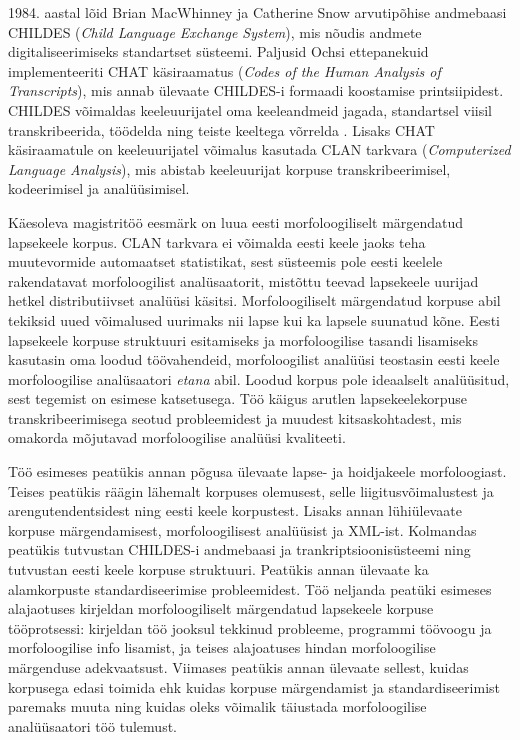 \documentclass[12pt]{article}
\begin{document}
1984. aastal lõid Brian MacWhinney ja Catherine Snow arvutipõhise andmebaasi CHILDES (\emph{Child Language Exchange System}), mis nõudis andmete digitaliseerimiseks standartset süsteemi. Paljusid Ochsi ettepanekuid implementeeriti CHAT käsiraamatus (\emph{Codes of the Human Analysis of Transcripts}), mis annab ülevaate CHILDES-i formaadi koostamise printsiipidest. CHILDES võimaldas keeleuurijatel oma keeleandmeid jagada, standartsel viisil transkribeerida, töödelda ning teiste keeltega võrrelda \citep{SnowMacWhinney}. Lisaks CHAT käsiraamatule on keeleuurijatel võimalus kasutada CLAN tarkvara (\emph{Computerized Language Analysis}), mis abistab keeleuurijat korpuse transkribeerimisel, kodeerimisel ja analüüsimisel.

Käesoleva magistritöö eesmärk on luua eesti morfoloogiliselt märgendatud lapsekeele korpus. CLAN tarkvara ei võimalda eesti keele jaoks teha muutevormide automaatset statistikat, sest süsteemis pole eesti keelele rakendatavat morfoloogilist analüsaatorit, mistõttu teevad lapsekeele uurijad hetkel distributiivset analüüsi käsitsi. Morfoloogiliselt märgendatud korpuse abil tekiksid uued võimalused uurimaks nii lapse kui ka lapsele suunatud kõne. Eesti lapsekeele korpuse struktuuri esitamiseks ja morfoloogilise tasandi lisamiseks kasutasin oma loodud töövahendeid, morfoloogilist analüüsi teostasin eesti keele morfoloogilise analüsaatori \emph{etana} abil. Loodud korpus pole ideaalselt analüüsitud, sest tegemist on esimese katsetusega. Töö käigus arutlen lapsekeelekorpuse transkribeerimisega seotud probleemidest ja muudest kitsaskohtadest, mis omakorda mõjutavad morfoloogilise analüüsi kvaliteeti.

Töö esimeses peatükis annan põgusa ülevaate lapse- ja hoidjakeele morfoloogiast. Teises peatükis räägin lähemalt korpuses olemusest, selle liigitusvõimalustest ja arengutendentsidest ning eesti keele korpustest. Lisaks annan lühiülevaate korpuse märgendamisest, morfoloogilisest analüüsist ja XML-ist. Kolmandas peatükis tutvustan CHILDES-i andmebaasi ja trankriptsioonisüsteemi ning tutvustan eesti keele korpuse struktuuri. Peatükis annan ülevaate ka alamkorpuste standardiseerimise probleemidest. Töö neljanda peatüki esimeses alajaotuses kirjeldan morfoloogiliselt märgendatud lapsekeele korpuse tööprotsessi: kirjeldan töö jooksul tekkinud probleeme, programmi töövoogu ja morfoloogilise info lisamist, ja teises alajoatuses hindan morfoloogilise märgenduse adekvaatsust. Viimases peatükis annan ülevaate sellest, kuidas korpusega edasi toimida ehk kuidas korpuse märgendamist ja standardiseerimist paremaks muuta ning kuidas oleks võimalik täiustada morfoloogilise analüüsaatori töö tulemust.
\end{document}
